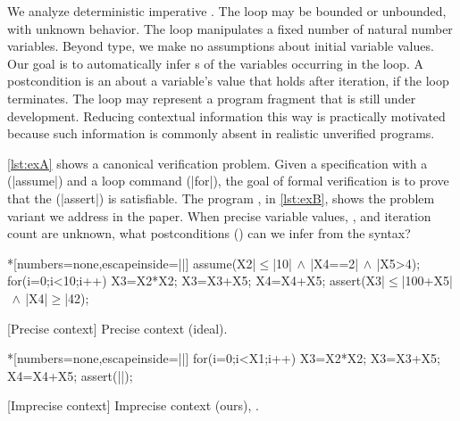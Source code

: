 We analyze deterministic imperative . The loop may be
bounded or unbounded, with unknown 
behavior. The loop manipulates a fixed number of natural number variables.
Beyond type, we make no assumptions about initial variable values. Our goal is
to automatically infer s of the variables occurring in the
loop. A postcondition is an  about a
variable's value that holds after iteration, if the loop terminates. The loop
may represent a program {fragment} that is still under development. Reducing
contextual information this way is practically motivated because such
information is commonly absent in realistic unverified programs.

\autoref{lst:exA} shows a canonical verification problem. Given a specification
with a  (\pr|assume|) and a loop command
(\pr|for|), the goal of formal verification is to prove that the
 (\pr|assert|) is
satisfiable. The program \emph{\explain}, in \autoref{lst:exB}, shows the
problem variant we address in the paper. When precise variable values,
, and iteration count are unknown, what postconditions
(\qtext) can we infer from the syntax?

\begin{center}
\begin{minipage}{.45\textwidth}
\captionsetup{type=lstlisting}
\begin{center}
\begin{minipage}{.9\textwidth}
\begin{implisting}*[numbers=none,escapeinside=||]
assume(X2|$\leq$|10|$\,\land\,$|X4==2|$\,\land\,$|X5>4);
for(i=0;i<10;i++) {
  X3=X2*X2;
  X3=X3+X5;
  X4=X4+X5; }
assert(X3|$\leq$|100+X5|$\,\land\,$|X4|$\geq$|42);
\end{implisting}
\end{minipage}
\end{center}
[Precise context]
{Precise context (ideal).}\label{lst:exA}
\end{minipage}\hfill%
\begin{minipage}{.52\textwidth}
\captionsetup{type=lstlisting}
\begin{center}
\begin{minipage}{.85\textwidth}
\begin{implisting}*[numbers=none,escapeinside=||]
for(i=0;i<X1;i++) {
  X3=X2*X2;
  X3=X3+X5;
  X4=X4+X5; }
assert(|\myqm|);
\end{implisting}
\end{minipage}
\end{center}
[Imprecise context]
{Imprecise context (ours), \mbox{\explain}.}\label{lst:exB}
\end{minipage}
\end{center}

